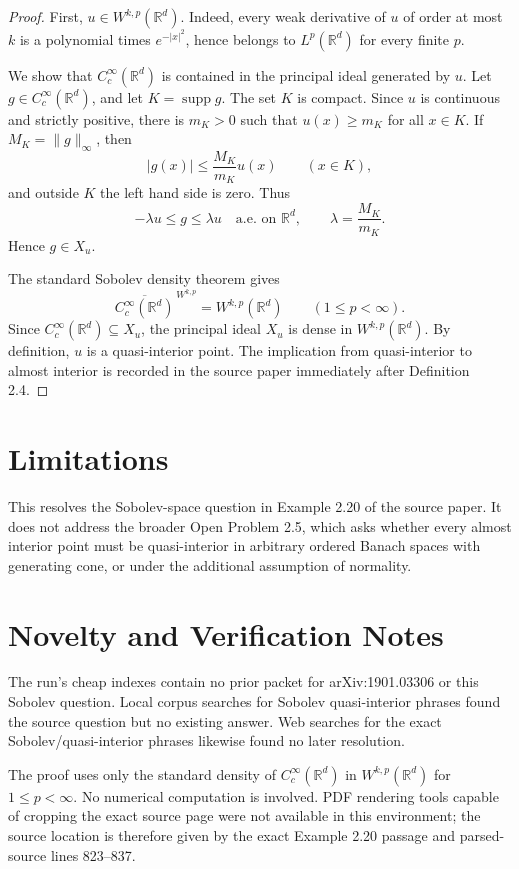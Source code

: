 \documentclass[11pt]{article}
\newcommand{\supp}{\operatorname{supp}}
\begin{document}
\begin{proof}
First, \(u\in W^{k,p}(\mathbb R^d)\).  Indeed, every weak derivative of \(u\) of
order at most \(k\) is a polynomial times \(e^{-|x|^2}\), hence belongs to
\(L^p(\mathbb R^d)\) for every finite \(p\).

We show that \(C_c^\infty(\mathbb R^d)\) is contained in the principal ideal
generated by \(u\).  Let \(g\in C_c^\infty(\mathbb R^d)\), and let
\(K=\supp g\).  The set \(K\) is compact.  Since \(u\) is continuous and
strictly positive, there is \(m_K>0\) such that \(u(x)\geq m_K\) for all
\(x\in K\).  If \(M_K=\|g\|_\infty\), then
\[
    |g(x)|\leq \frac{M_K}{m_K}u(x)\qquad (x\in K),
\]
and outside \(K\) the left hand side is zero.  Thus
\[
    -\lambda u\leq g\leq \lambda u
    \quad\text{a.e. on }\mathbb R^d,
    \qquad
    \lambda=\frac{M_K}{m_K}.
\]
Hence \(g\in X_u\).

The standard Sobolev density theorem gives
\[
    \overline{C_c^\infty(\mathbb R^d)}^{\,W^{k,p}}=W^{k,p}(\mathbb R^d)
    \qquad (1\leq p<\infty).
\]
Since \(C_c^\infty(\mathbb R^d)\subseteq X_u\), the principal ideal \(X_u\) is
dense in \(W^{k,p}(\mathbb R^d)\).  By definition, \(u\) is a quasi-interior
point.  The implication from quasi-interior to almost interior is recorded in
the source paper immediately after Definition 2.4.
\end{proof}

\section*{Limitations}

This resolves the Sobolev-space question in Example 2.20 of the source paper.
It does not address the broader Open Problem 2.5, which asks whether every
almost interior point must be quasi-interior in arbitrary ordered Banach spaces
with generating cone, or under the additional assumption of normality.

\section*{Novelty and Verification Notes}

The run's cheap indexes contain no prior packet for arXiv:1901.03306 or this
Sobolev question.  Local corpus searches for Sobolev quasi-interior phrases
found the source question but no existing answer.  Web searches for the exact
Sobolev/quasi-interior phrases likewise found no later resolution.

The proof uses only the standard density of \(C_c^\infty(\mathbb R^d)\) in
\(W^{k,p}(\mathbb R^d)\) for \(1\leq p<\infty\).  No numerical computation is
involved.  PDF rendering tools capable of cropping the exact source page were
not available in this environment; the source location is therefore given by
the exact Example 2.20 passage and parsed-source lines 823--837.
\end{document}
